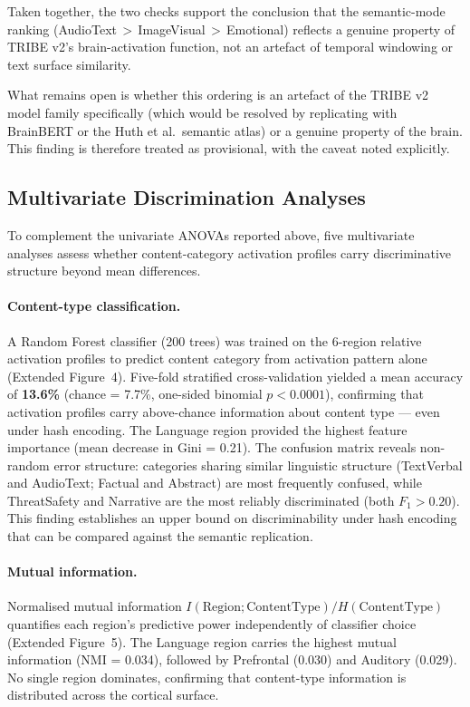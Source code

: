 \documentclass[11pt,letterpaper]{article}
\numberwithin{equation}{section}
\begin{document}
Taken together, the two checks support the conclusion that the semantic-mode ranking (AudioText\,$>$\,ImageVisual\,$>$\,Emotional) reflects a genuine property of TRIBE v2's brain-activation function, not an artefact of temporal windowing or text surface similarity.

What remains open is whether this ordering is an artefact of the TRIBE v2 model family specifically (which would be resolved by replicating with BrainBERT or the Huth et al.\ semantic atlas) or a genuine property of the brain. This finding is therefore treated as provisional, with the caveat noted explicitly.

\subsection{Multivariate Discrimination Analyses}\label{sec:multivariate}

To complement the univariate ANOVAs reported above, five multivariate analyses assess whether content-category activation profiles carry discriminative structure beyond mean differences.

\paragraph{Content-type classification.} A Random Forest classifier (200 trees) was trained on the 6-region relative activation profiles to predict content category from activation pattern alone (Extended Figure~4). Five-fold stratified cross-validation yielded a mean accuracy of \textbf{13.6\%} (chance = 7.7\%, one-sided binomial $p < 0.0001$), confirming that activation profiles carry above-chance information about content type --- even under hash encoding. The Language region provided the highest feature importance (mean decrease in Gini = 0.21). The confusion matrix reveals non-random error structure: categories sharing similar linguistic structure (TextVerbal and AudioText; Factual and Abstract) are most frequently confused, while ThreatSafety and Narrative are the most reliably discriminated (both $F_1 > 0.20$). This finding establishes an upper bound on discriminability under hash encoding that can be compared against the semantic replication.

\paragraph{Mutual information.} Normalised mutual information $I(\text{Region}; \text{ContentType}) / H(\text{ContentType})$ quantifies each region's predictive power independently of classifier choice (Extended Figure~5). The Language region carries the highest mutual information (NMI = 0.034), followed by Prefrontal (0.030) and Auditory (0.029). No single region dominates, confirming that content-type information is distributed across the cortical surface.
\end{document}
